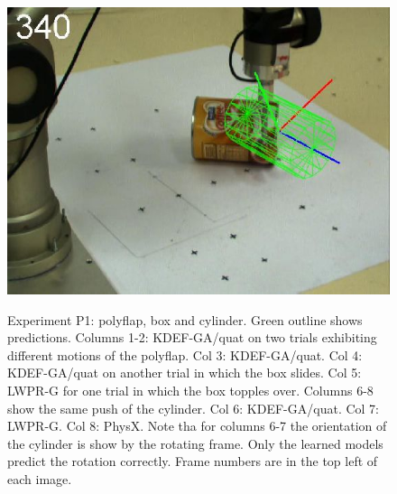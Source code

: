 \begin{figure}[htbp]
{\includegraphics[width=\imgAXwid]{./A3_physx_39_5}
}
\caption {Experiment P1: polyflap, box and cylinder. Green outline shows
  predictions. Columns 1-2: KDEF-GA/quat on two trials exhibiting
  different motions of the polyflap. Col 3: KDEF-GA/quat. Col 4: KDEF-GA/quat on another trial in
  which the box slides. Col 5: LWPR-G for one trial in
  which the box topples over.  Columns 6-8 show the same push of the
  cylinder. Col 6: KDEF-GA/quat. Col 7: LWPR-G. Col 8: PhysX. Note tha
  for columns 6-7 the orientation of the cylinder is show by the
  rotating frame. Only the learned models predict the rotation
  correctly. Frame numbers are in the top left of each image. }
\label{fig:ExperimentL2}
\end{figure}



